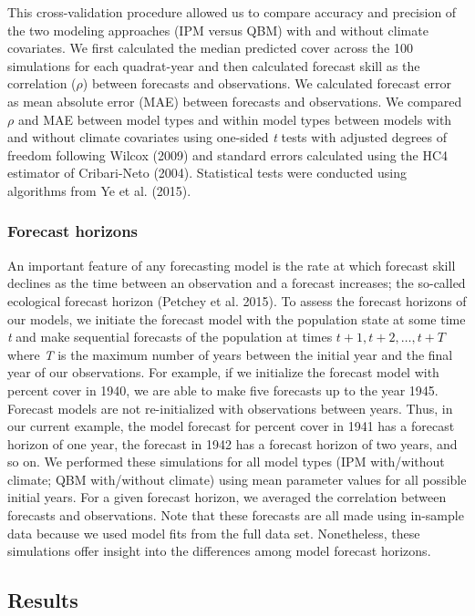 \documentclass[12pt,]{article}
\begin{document}
This cross-validation procedure allowed us to compare accuracy and
precision of the two modeling approaches (IPM versus QBM) with and
without climate covariates. We first calculated the median predicted
cover across the 100 simulations for each quadrat-year and then
calculated forecast skill as the correlation (\(\rho\)) between
forecasts and observations. We calculated forecast error as mean
absolute error (MAE) between forecasts and observations. We compared
\(\rho\) and MAE between model types and within model types between
models with and without climate covariates using one-sided \emph{t}
tests with adjusted degrees of freedom following Wilcox (2009) and
standard errors calculated using the HC4 estimator of Cribari-Neto
(2004). Statistical tests were conducted using algorithms from Ye et al.
(2015).

\subsubsection{Forecast horizons}\label{forecast-horizons}

An important feature of any forecasting model is the rate at which
forecast skill declines as the time between an observation and a
forecast increases; the so-called ecological forecast horizon (Petchey
et al. 2015). To assess the forecast horizons of our models, we initiate
the forecast model with the population state at some time \emph{t} and
make sequential forecasts of the population at times
\(t+1, t+2, \dots, t+T\) where \emph{T} is the maximum number of years
between the initial year and the final year of our observations. For
example, if we initialize the forecast model with percent cover in 1940,
we are able to make five forecasts up to the year 1945. Forecast models
are not re-initialized with observations between years. Thus, in our
current example, the model forecast for percent cover in 1941 has a
forecast horizon of one year, the forecast in 1942 has a forecast
horizon of two years, and so on. We performed these simulations for all
model types (IPM with/without climate; QBM with/without climate) using
mean parameter values for all possible initial years. For a given
forecast horizon, we averaged the correlation between forecasts and
observations. Note that these forecasts are all made using in-sample
data because we used model fits from the full data set. Nonetheless,
these simulations offer insight into the differences among model
forecast horizons.

\subsection{Results}\label{results}
\end{document}
